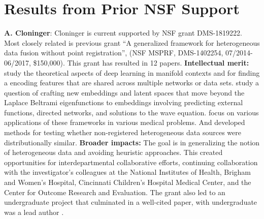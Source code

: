 
\section{Results from Prior NSF Support }

{\bf A. Cloninger}: Cloninger is current supported by NSF grant DMS-1819222.  Most closely related is previous grant ``A generalized framework for heterogeneous data fusion without point registration'', (NSF MSPRF, DMS-1402254, 07/2014-06/2017, \$150,000). This grant has resulted in 12 papers. %
{\bf Intellectual merit:} \cite{mishne2017diffusion,cloninger2018bigeometric,shaham2018provable} study the theoretical aspects of deep learning in manifold contexts and for finding a encoding features that are shared across multiple networks or data sets.  \cite{cloninger2017spectral, cloninger2017note, cloninger2017prediction} study a question of crafting new embeddings and latent spaces that move beyond the Laplace Beltrami eigenfunctions to embeddings involving predicting external functions, directed networks, and solutions to the wave equation.%
\cite{cloninger2016function, downing2017describing, bates2017outcome, katzman2018deepsurv} focus on various applications of these frameworks in various medical problems.  And \cite{cheng2017two,cloninger2018people} developed methods for testing whether non-registered heterogeneous data sources were distributionally similar.
{\bf Broader impacts:}
The goal is in generalizing the notion of heterogeneous data and avoiding heuristic approaches.  This created opportunities for interdepartmental collaborative efforts, continuing collaboration with the investigator's colleagues at the National Institutes of Health, Brigham and Women's Hospital, Cincinnati Children's Hospital Medical Center, and the Center for Outcome Research and Evaluation.  The grant also led to an undergraduate project that culminated in a well-cited paper, with undergraduate was a lead author \cite{katzman2018deepsurv}.



